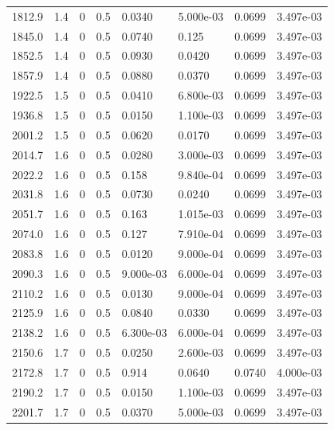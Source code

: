 \documentclass[preview]{standalone}
\begin{document}
{{{{\begin{tabular}{L{1.2cm}C{1.2cm} C{0.3cm}C{0.5cm} C{1.4cm}C{1.4cm} C{1.4cm}C{1.4cm}}
  1812.9  &   1.4  & 0     & 0.5 &  0.0340  & 5.000e-03  & 0.0699 &  3.497e-03   \\ 
  1845.0  &   1.4  & 0     & 0.5 &  0.0740  & 0.125  & 0.0699 &  3.497e-03   \\ 
  1852.5  &   1.4  & 0     & 0.5 &  0.0930  & 0.0420  & 0.0699 &  3.497e-03   \\ 
  1857.9  &   1.4  & 0     & 0.5 &  0.0880  & 0.0370  & 0.0699 &  3.497e-03   \\ 
  1922.5  &   1.5  & 0     & 0.5 &  0.0410  & 6.800e-03  & 0.0699 &  3.497e-03   \\ 
  1936.8  &   1.5  & 0     & 0.5 &  0.0150  & 1.100e-03  & 0.0699 &  3.497e-03   \\ 
  2001.2  &   1.5  & 0     & 0.5 &  0.0620  & 0.0170  & 0.0699 &  3.497e-03   \\ 
  2014.7  &   1.6  & 0     & 0.5 &  0.0280  & 3.000e-03  & 0.0699 &  3.497e-03   \\ 
  2022.2  &   1.6  & 0     & 0.5 &  0.158  & 9.840e-04  & 0.0699 &  3.497e-03   \\ 
  2031.8  &   1.6  & 0     & 0.5 &  0.0730  & 0.0240  & 0.0699 &  3.497e-03   \\ 
  2051.7  &   1.6  & 0     & 0.5 &  0.163  & 1.015e-03  & 0.0699 &  3.497e-03   \\ 
  2074.0  &   1.6  & 0     & 0.5 &  0.127  & 7.910e-04  & 0.0699 &  3.497e-03   \\ 
  2083.8  &   1.6  & 0     & 0.5 &  0.0120  & 9.000e-04  & 0.0699 &  3.497e-03   \\ 
  2090.3  &   1.6  & 0     & 0.5 &  9.000e-03  & 6.000e-04  & 0.0699 &  3.497e-03   \\ 
  2110.2  &   1.6  & 0     & 0.5 &  0.0130  & 9.000e-04  & 0.0699 &  3.497e-03   \\ 
  2125.9  &   1.6  & 0     & 0.5 &  0.0840  & 0.0330  & 0.0699 &  3.497e-03   \\ 
  2138.2  &   1.6  & 0     & 0.5 &  6.300e-03  & 6.000e-04  & 0.0699 &  3.497e-03   \\ 
  2150.6  &   1.7  & 0     & 0.5 &  0.0250  & 2.600e-03  & 0.0699 &  3.497e-03   \\ 
  2172.8  &   1.7  & 0     & 0.5 &  0.914  & 0.0640  & 0.0740 &  4.000e-03   \\ 
  2190.2  &   1.7  & 0     & 0.5 &  0.0150  & 1.100e-03  & 0.0699 &  3.497e-03   \\ 
  2201.7  &   1.7  & 0     & 0.5 &  0.0370  & 5.000e-03  & 0.0699 &  3.497e-03   \\ 

\end{tabular}}}}}
\end{document}
